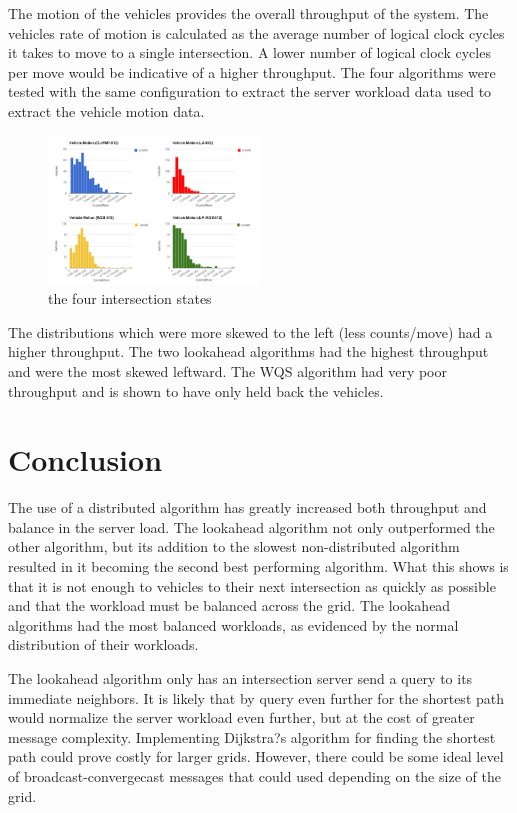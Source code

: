 \documentclass[conference]{IEEEtran}
\begin{document}
The motion of the vehicles provides the overall throughput of the system. The vehicles rate of motion is calculated as the average number of logical clock cycles it takes to move to a single intersection. A lower number of logical clock cycles per move would be indicative of a higher throughput. The four algorithms were tested with the same configuration to extract the server workload data used to extract the vehicle motion data.


\begin{figure}[h]
    \center    
    \includegraphics[width=0.5\textwidth]{images/vehicle_motion.png}
	\caption{the four intersection states}
	\label{intersection_states}
\end{figure}


The distributions which were more skewed to the left (less counts/move) had a higher throughput. The two lookahead algorithms had the highest throughput and were the most skewed leftward. The WQS algorithm had very poor throughput and is shown to have only held back the vehicles.

\section{Conclusion}
The use of a distributed algorithm has greatly increased both throughput and balance in the server load. The lookahead algorithm not only outperformed the other algorithm, but its addition to the slowest non-distributed algorithm resulted in it becoming the second best performing algorithm. What this shows is that it is not enough to vehicles to their next intersection as quickly as possible and that the workload must be balanced across the grid. The lookahead algorithms had the most balanced workloads, as evidenced by the normal distribution of their workloads.

The lookahead algorithm only has an intersection server send a query to its immediate neighbors. It is likely that by query even further for the shortest path would normalize the server workload even further, but at the cost of greater message complexity. Implementing Dijkstra?s algorithm for finding the shortest path could prove costly for larger grids. However, there could be some ideal level of broadcast-convergecast messages that could used depending on the size of the grid.
\end{document}
